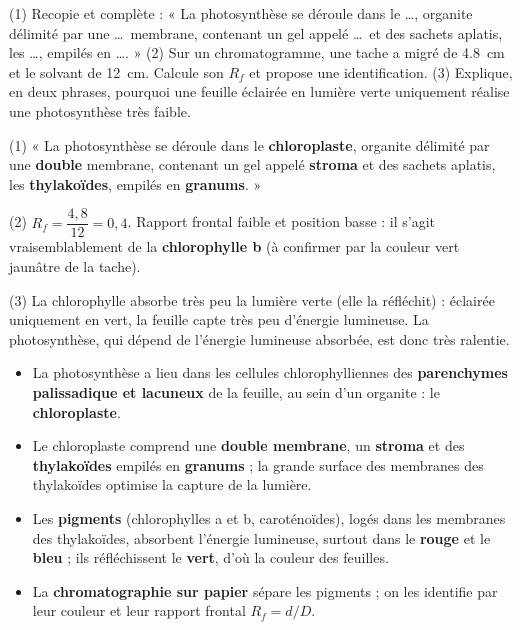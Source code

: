 \documentclass[11pt]{article}
\begin{document}
\begin{exercice}
(1) Recopie et complète : « La photosynthèse se déroule dans le \ldots, organite délimité par une \ldots\ membrane, contenant un gel appelé \ldots\ et des sachets aplatis, les \ldots, empilés en \ldots. »
(2) Sur un chromatogramme, une tache a migré de \SI{4,8}{cm} et le solvant de \SI{12}{cm}. Calcule son $R_f$ et propose une identification.
(3) Explique, en deux phrases, pourquoi une feuille éclairée en lumière verte uniquement réalise une photosynthèse très faible.
\end{exercice}

\begin{corrige}[Exercice n°1]
(1) « La photosynthèse se déroule dans le \textbf{chloroplaste}, organite délimité par une \textbf{double} membrane, contenant un gel appelé \textbf{stroma} et des sachets aplatis, les \textbf{thylakoïdes}, empilés en \textbf{granums}. »

(2) $R_f = \dfrac{4{,}8}{12} = 0{,}4$. Rapport frontal faible et position basse : il s'agit vraisemblablement de la \textbf{chlorophylle b} (à confirmer par la couleur vert jaunâtre de la tache).

(3) La chlorophylle absorbe très peu la lumière verte (elle la réfléchit) : éclairée uniquement en vert, la feuille capte très peu d'énergie lumineuse. La photosynthèse, qui dépend de l'énergie lumineuse absorbée, est donc très ralentie.
\end{corrige}

\begin{aretenir}
\begin{itemize}
\item La photosynthèse a lieu dans les cellules chlorophylliennes des \textbf{parenchymes palissadique et lacuneux} de la feuille, au sein d'un organite : le \textbf{chloroplaste}.
\item Le chloroplaste comprend une \textbf{double membrane}, un \textbf{stroma} et des \textbf{thylakoïdes} empilés en \textbf{granums} ; la grande surface des membranes des thylakoïdes optimise la capture de la lumière.
\item Les \textbf{pigments} (chlorophylles a et b, caroténoïdes), logés dans les membranes des thylakoïdes, absorbent l'énergie lumineuse, surtout dans le \textbf{rouge} et le \textbf{bleu} ; ils réfléchissent le \textbf{vert}, d'où la couleur des feuilles.
\item La \textbf{chromatographie sur papier} sépare les pigments ; on les identifie par leur couleur et leur rapport frontal $R_f = d/D$.
\end{itemize}
\end{aretenir}
\end{document}
